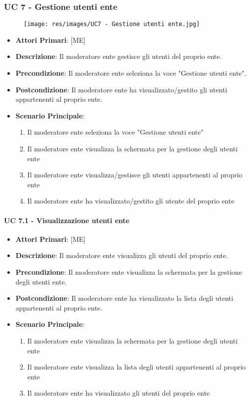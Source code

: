 		\subsubsection{UC 7 - Gestione utenti ente}
		
		\begin{figure}[t!]
			\centering
			\texttt{[image: res/images/UC7 - Gestione utenti ente.jpg]}
		\end{figure}
		
		\begin{itemize}
			\item \textbf{Attori Primari}: [ME]
			\item \textbf{Descrizione}: Il moderatore ente gestisce gli utenti del proprio ente.
			\item \textbf{Precondizione}: Il moderatore ente seleziona la voce "Gestione utenti ente".
			\item \textbf{Postcondizione}: Il moderatore ente ha visualizzato/gestito gli utenti appartenenti al proprio ente.
			\item \textbf{Scenario Principale}:
			\begin{enumerate}
				\item{Il moderatore ente seleziona la voce "Gestione utenti ente"}
				\item{Il moderatore ente visualizza la schermata per la gestione degli utenti ente}
				\item{Il moderatore ente visualizza/gestisce gli utenti appartenenti al proprio ente}
				\item{Il moderatore ente ha visualizzato/gestito gli utente del proprio ente}
			\end{enumerate}	
		\end{itemize}
			
			\paragraph{UC 7.1 - Visualizzazione utenti ente}
			\begin{itemize}
				\item \textbf{Attori Primari}: [ME]
				\item \textbf{Descrizione}: Il moderatore ente visualizza gli utenti del proprio ente.
				\item \textbf{Precondizione}: Il moderatore ente visualizza la schermata per la gestione degli utenti ente.
				\item \textbf{Postcondizione}: Il moderatore ente ha visualizzato la lista degli utenti appartenenti al proprio ente.
				\item \textbf{Scenario Principale}:
				\begin{enumerate}
					\item{Il moderatore ente visualizza la schermata per la gestione degli utenti ente}
					\item{Il moderatore ente visualizza la lista degli utenti appartenenti al proprio ente}
					\item{Il moderatore ente ha visualizzato gli utenti del proprio ente}
				\end{enumerate}	
			\end{itemize}
			
